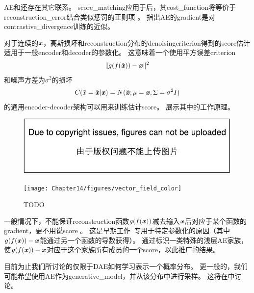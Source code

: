 \gls{AE}和还存在其它联系。
\gls{score_matching}应用于后，其\gls{cost_function}将等价于\gls{reconstruction_error}结合类似惩罚的正则项 \citep{Swersky-ICML2011}。
\citet{Bengio+Delalleau-2009}指出\gls{AE}的\gls{gradient}是对\gls{contrastive_divergence}训练的近似。


对于连续的$\boldsymbol{\mathit{x}}$，高斯损坏和\gls{reconstruction}分布的\gls{denoising}\gls{criterion}得到的\gls{score}估计适用于一般\gls{encoder}和\gls{decoder}的参数化\citep{Alain+Bengio-ICLR2013-small}。
这意味着一个使用平方误差\gls{criterion}
\begin{align}
 \| g(f(\tilde {\boldsymbol{\mathit{x}}})) - \boldsymbol{\mathit{x}} \|^2
\end{align}
和噪声方差为$\sigma^2 $的损坏
\begin{align}
 C(\tilde x = \tilde {\boldsymbol{\mathit{x}}} | \boldsymbol{\mathit{x}}) = N(\tilde {\boldsymbol{\mathit{x}}}; \mu=\boldsymbol{\mathit{x}}, \Sigma = \sigma^2 I)
\end{align}
的通用\gls{encoder}-\gls{decoder}架构可以用来训练估计\gls{score}。
展示其中的工作原理。

\begin{figure}[!htb]
\ifOpenSource
\centerline{\includegraphics{figure.pdf}}
\else
\centerline{\texttt{[image: Chapter14/figures/vector\_field\_color]}}
\fi
\caption{TODO}
\label{fig:chap14_vector_field_color}
\end{figure}

一般情况下，不能保证\gls{reconstruction}函数$g(f(\boldsymbol{\mathit{x}}))$减去输入$\boldsymbol{\mathit{x}}$后对应于某个函数的\gls{gradient}，更不用说\gls{score} 。
这是早期工作~\citep{Vincent-NC-2011-small}专用于特定参数化的原因（其中$g(f(\boldsymbol{\mathit{x}})) - \boldsymbol{\mathit{x}}$能通过另一个函数的导数获得）。
\citet{Kamyshanska+Memisevic-2015}通过标识一类特殊的浅层\gls{AE}家族，使$g(f(\boldsymbol{\mathit{x}})) - \boldsymbol{\mathit{x}}$对应于这个家族所有成员的一个\gls{score}，以此推广\citet{Vincent-NC-2011-small}的结果。


目前为止我们所讨论的仅限于\gls{DAE}如何学习表示一个概率分布。
更一般的，我们可能希望使用\gls{AE}作为\gls{generative_model}，并从该分布中进行采样。
这将在中讨论。

